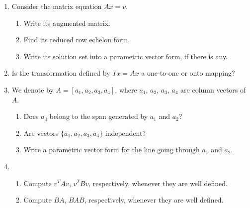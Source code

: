 \documentclass[11pt]{amsart}
\begin{document}
\begin{enumerate}
\item  Consider the matrix equation $Ax = v$. 
\begin{enumerate}
\item Write its augmented matrix.
\vspace{.5in}
\item Find its reduced row echelon form.
\vspace{.5in}
\vspace{.5in}
\vspace{.5in}
\item  Write its solution set into a parametric vector form, if there is any.
\vspace{.5in}
\vspace{.5in}
\vspace{.5in}
\end{enumerate}

\item  %
Is the transformation defined by $Tx = Ax$
a one-to-one or onto mapping?

\vspace{.5in}
\vspace{.5in}


\newpage
\item We denote by $A = [a_1, a_2, a_3, a_4]$, where $a_1$, $a_2$, $a_3$, $a_4$ are column vectors of $A$.
\begin{enumerate}
\item Does  $a_3$ belong to the span generated by $a_1$ and $a_2$?
\vspace{.5in}
\vspace{.5in}
  \item
Are vectors $\{a_1, a_2, a_3, a_4\}$ independent?
\vspace{.5in}
\vspace{.5in}
\vspace{.5in}
\item
 Write a parametric vector form for the line going through $a_1$ and $a_2$.
 \vspace{.5in}
 \vspace{.5in}
 \vspace{.5in}
\end{enumerate}



\item
\begin{enumerate}
\item Compute $v^TAv$, $v^TBv$, respectively, whenever they are well defined.
\vspace{.5in}
\vspace{.5in}
\item
Compute $BA$, $BAB$, respectively, whenever they are well defined.


\end{enumerate}
\end{enumerate}
\end{document}
